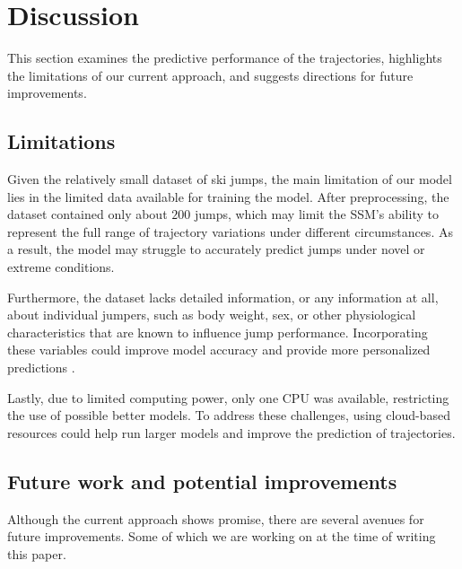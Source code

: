 \documentclass[sigconf,natbib=false, language=english]{acmart}
\begin{document}
\section{Discussion}
\label{sec:discussion}



This section examines the predictive performance of the trajectories, highlights the limitations of our current approach, and suggests directions for future improvements.

\subsection{Limitations}

Given the relatively small dataset of ski jumps, the main limitation of our model lies in the limited data available for training the model.
After preprocessing, the dataset contained only about $200$ jumps, which may limit the SSM's ability to represent the full range of trajectory variations under different circumstances. As a result, the model may struggle to accurately predict jumps under novel or extreme conditions.

Furthermore, the dataset lacks detailed information, or any information at all, 
about individual jumpers, such as body weight, sex, or other physiological characteristics that are known to influence jump performance. Incorporating these variables could improve model accuracy and provide more personalized predictions \cite{muller2008performance}. 

Lastly, due to limited computing power, only one CPU was available, restricting the use of possible better models. To address these challenges, using cloud-based resources could help run larger models and improve the prediction of trajectories.

\subsection{Future work and potential improvements}

Although the current approach shows promise, there are several avenues for
future improvements. Some of which we are working on at the time of writing
this paper.
\end{document}
